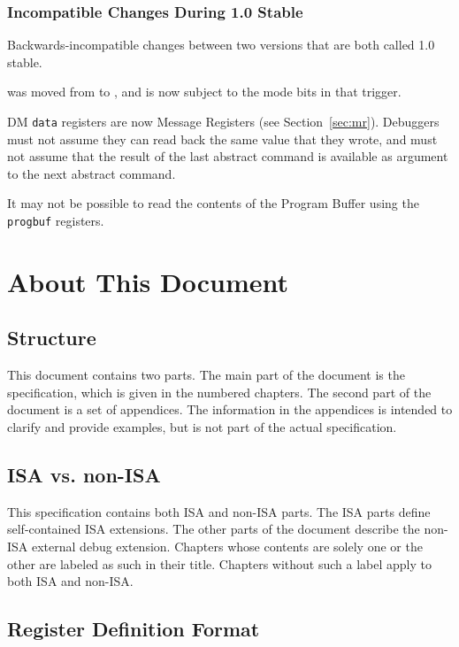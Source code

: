\subsubsection{Incompatible Changes During 1.0 Stable}

\begin{steps}{Backwards-incompatible changes between two versions that are both
called 1.0 stable.}
\item \FcsrItriggerNmi was moved from \RcsrEtrigger to \RcsrItrigger, and is now
subject to the mode bits in that trigger.
\item DM {\tt data} registers are now Message Registers (see
Section~\ref{sec:mr}). Debuggers must not assume they can read back the same
value that they wrote, and must not assume that the result of the last abstract
command is available as argument to the next abstract command. 
\item It may not be possible to read the contents of the Program Buffer using
the {\tt progbuf} registers. 
\end{steps}

\section{About This Document}

\subsection{Structure}

This document contains two parts. The main part of the document is the
specification, which is given in the numbered chapters. The second part
of the document is a set of appendices. The information
in the appendices is intended to clarify and provide examples, but is
not part of the actual specification.

\subsection{ISA vs. non-ISA}

This specification contains both ISA and non-ISA parts. The ISA parts define
self-contained ISA extensions. The other parts of the document describe the
non-ISA external debug extension.
Chapters whose contents are solely one or the other are labeled as such in their
title. Chapters without such a label apply to both ISA and non-ISA.

\subsection{Register Definition Format}

